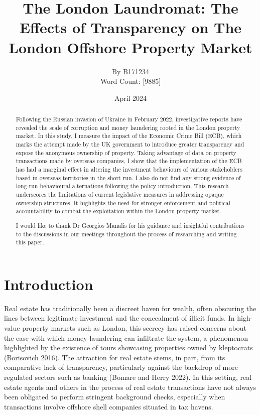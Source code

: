 \documentclass{article}
\title{The London Laundromat: The Effects of Transparency on The London Offshore Property Market}
\author{
By B171234 \\
\vspace{1cm}
Word Count: [9885] }
\date{April 2024}
\begin{document}
\maketitle
{}

\begin{abstract}
Following the Russian invasion of Ukraine in February 2022, investigative reports have revealed the scale of corruption and money laundering rooted in the London property market. In this study, I measure the impact of the Economic Crime Bill (ECB), which marks the attempt made by the UK government to introduce greater transparency and expose the anonymous ownership of property. Taking advantage of data on property transactions made by overseas companies, I show that the implementation of the ECB has had a marginal effect in altering the investment behaviours of various stakeholders based in overseas territories in the short run. I also do not find any strong evidence of long-run behavioural alternations following the policy introduction. This research underscores the limitations of current legislative measures in addressing opaque ownership structures. It highlights the need for stronger enforcement and political accountability to combat the exploitation within the London property market.
\end{abstract}

\renewcommand{\abstractname}{Acknowledgements}
\begin{abstract}
I would like to thank Dr Georgios Manalis for his guidance and insightful contributions to the discussions in our meetings throughout the process of researching and writing this paper. 
\end{abstract}


\newpage 
\tableofcontents 
\newpage
\maketitle

\normalsize

\section{Introduction}

Real estate has traditionally been a discreet haven for wealth, often obscuring the lines between legitimate investment and the concealment of illicit funds. In high-value property markets such as London, this secrecy has raised concerns about the ease with which money laundering can infiltrate the system, a phenomenon highlighted by the existence of tours showcasing properties owned by kleptocrats (Borisovich 2016). The attraction for real estate stems, in part, from its comparative lack of transparency, particularly against the backdrop of more regulated sectors such as banking (Bomare and Herry 2022). In this setting, real estate agents and others in the process of real estate transactions have not always been obligated to perform stringent background checks, especially when transactions involve offshore shell companies situated in tax havens. 
\end{document}
